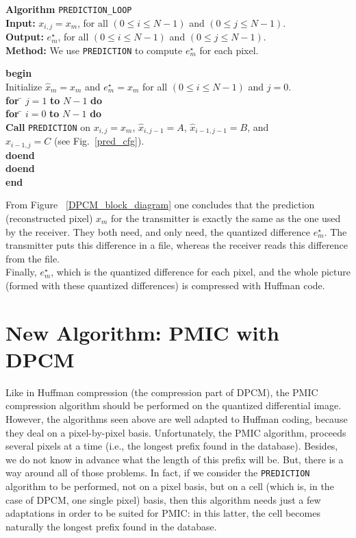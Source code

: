 \documentclass[11pt,a4paper]{article}
\newcommand{\xh}{\hat{x}}
\newcommand{\xm}{x_m}
\newcommand{\xmh}{\hat{x}_m}
\newcommand{\ems}{e^{\star}_m}
\begin{document}
{\bf Algorithm} {\tt PREDICTION\_LOOP}\\
{\bf Input:} $x_{i,j} = \xm$, for all $(0\leq i\leq N-1)$ and $(0\leq
j\leq N-1)$.\\
{\bf Output:} $\ems$, for all $(0\leq i\leq N-1)$ and $(0\leq
j\leq N-1)$.\\
{\bf Method:} We use {\tt PREDICTION} to compute $\ems$ for each
pixel.
\begin{tabbing}
{\bf begin}\=  \\
        \> Initialize $\xmh = \xm$ and $\ems = \xm$ for all $(0\leq i\leq N-1)$ and $j=0$.\\
        \> {\bf for} \= $j=1$ {\bf to} $N-1$ {\bf do} \\
        \> \> {\bf for} \= $i=0$ {\bf to} $N-1$ {\bf do} \\
        \>  \>  \> {\bf Call} {\tt PREDICTION} on $x_{i,j} = \xm$, $\xh_{i,j-1} = A$, $\xh_{i-1,j-1} = B$, and\\
        \> \> \> $\xh_{i-1,j} = C$ (see Fig.~\ref{pred_cfg}).\\
        \>  \> {\bf doend} \\
        \>  {\bf doend} \\
{\bf end}
\end{tabbing}

From Figure ~\ref{DPCM_block_diagram} one concludes that the prediction
(reconstructed pixel) $\xmh$ for the transmitter is exactly the same as the
one used by the receiver. They both need, and only need, the quantized
difference $\ems$. The transmitter puts this difference in a file, whereas
the receiver reads this difference from the file.\\

Finally, $\ems$, which is the quantized difference for each pixel, and the
whole picture (formed with these quantized differences) is compressed with
Huffman code.

\section{New Algorithm: PMIC with DPCM}


Like in Huffman compression (the compression part of DPCM), the PMIC
compression algorithm should be performed on the quantized differential
image. However, the algorithms seen above are well adapted to Huffman
coding, because they deal on a pixel-by-pixel basis. Unfortunately, the
PMIC algorithm, proceeds several pixels at a time (i.e., the longest prefix
found in the database). Besides, we do not know in advance what the length
of this prefix will be. But, there is a way around all of those problems.
In fact, if we consider the {\tt PREDICTION} algorithm to be performed, not
on a pixel basis, but on a cell (which is, in the case of DPCM, one single
pixel) basis, then this algorithm needs just a few adaptations in order to
be suited for PMIC: in this latter, the cell becomes naturally the longest
prefix found in the database.\\
\end{document}
